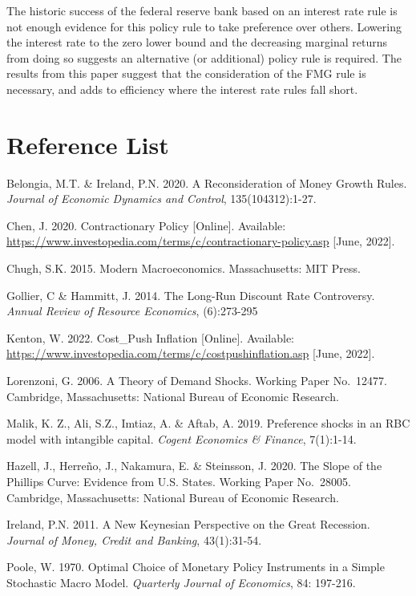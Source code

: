 \documentclass[11pt,preprint, authoryear]{elsarticle}
\numberwithin{equation}{section}
\numberwithin{figure}{section}
\numberwithin{table}{section}
\begin{document}
The historic success of the federal reserve bank based on an interest
rate rule is not enough evidence for this policy rule to take preference
over others. Lowering the interest rate to the zero lower bound and the
decreasing marginal returns from doing so suggests an alternative (or
additional) policy rule is required. The results from this paper suggest
that the consideration of the FMG rule is necessary, and adds to
efficiency where the interest rate rules fall short.

\newpage

\hypertarget{reference-list}{%
\section{Reference List}\label{reference-list}}

Belongia, M.T. \& Ireland, P.N. 2020. A Reconsideration of Money Growth
Rules. \emph{Journal of Economic Dynamics and Control},
135(104312):1-27.

Chen, J. 2020. Contractionary Policy {[}Online{]}. Available:
\url{https://www.investopedia.com/terms/c/contractionary-policy.asp}
{[}June, 2022{]}.

Chugh, S.K. 2015. Modern Macroeconomics. Massachusetts: MIT Press.

Gollier, C \& Hammitt, J. 2014. The Long-Run Discount Rate Controversy.
\emph{Annual Review of Resource Economics}, (6):273-295

Kenton, W. 2022. Cost\_Push Inflation {[}Online{]}. Available:
\url{https://www.investopedia.com/terms/c/costpushinflation.asp}
{[}June, 2022{]}.

Lorenzoni, G. 2006. A Theory of Demand Shocks. Working Paper No.~12477.
Cambridge, Massachusetts: National Bureau of Economic Research.

Malik, K. Z., Ali, S.Z., Imtiaz, A. \& Aftab, A. 2019. Preference shocks
in an RBC model with intangible capital. \emph{Cogent Economics \&
Finance}, 7(1):1-14.

Hazell, J., Herreño, J., Nakamura, E. \& Steinsson, J. 2020. The Slope
of the Phillips Curve: Evidence from U.S. States. Working Paper
No.~28005. Cambridge, Massachusetts: National Bureau of Economic
Research.

Ireland, P.N. 2011. A New Keynesian Perspective on the Great Recession.
\emph{Journal of Money, Credit and Banking}, 43(1):31-54.

Poole, W. 1970. Optimal Choice of Monetary Policy Instruments in a
Simple Stochastic Macro Model. \emph{Quarterly Journal of Economics},
84: 197-216.
\end{document}

